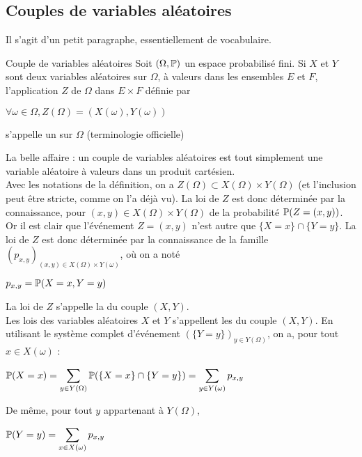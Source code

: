 \documentclass[12pt,a4paper]{report}
\begin{document}
\subsection{Couples de variables aléatoires}
Il s'agit d'un petit paragraphe, essentiellement de vocabulaire.

\begin{definition}{Couple de variables aléatoires}{}
Soit $(\Omega, \mathbb{P})$ un espace probabilisé fini. Si $X$ et $Y$ sont deux variables aléatoires sur $\Omega$, à valeurs dans les ensembles $E$ et $F$, l'application $Z$ de $\Omega$ dans $E \times F$ définie par 
\begin{center}
$\forall \omega \in \Omega, Z(\Omega) = (X(\omega), Y(\omega))$
\end{center}
s'appelle un  sur $\Omega$ (terminologie officielle)
\end{definition}

La belle affaire : un couple de variables aléatoires est tout simplement une variable aléatoire à valeurs dans un produit cartésien. \\

Avec les notations de la définition, on a $Z(\Omega) \subset X(\Omega) \times Y(\Omega)$ (et l'inclusion peut être stricte, comme on l'a déjà vu). La loi de $Z$ est donc déterminée par la connaissance, pour $(x,y) \in X(\Omega) \times Y(\Omega)$ de la probabilité $\mathbb{P}(Z=(x,y))$. \\
Or il est clair que l'événement $Z=(x,y)$ n'est autre que $\{X=x\} \cap \{Y=y\}$. La loi de $Z$ est donc déterminée par la connaissance de la famille $(p_{x,y})_{(x,y) \in X(\Omega) \times Y(\omega)}$, où on a noté 
\begin{center}
$p_{x,y} = \mathbb{P}(X=x,Y=y)$
\end{center}

La loi de $Z$ s'appelle la  du couple $(X,Y)$. \\

Les lois des variables aléatoires $X$ et $Y$ s'appellent les  du couple $(X,Y)$. En utilisant le système complet d'événement $(\{Y=y\})_{y \in Y(\Omega)}$, on a, pour tout $x \in X(\omega)$ :
\begin{center}
$\mathbb{P}(X=x) = \displaystyle \sum_{y\in Y(\Omega)} \mathbb{P}(\{X=x\} \cap \{Y=y\}) = \sum_{y \in Y(\omega)} p_{x,y}$
\end{center}

De même, pour tout $y$ appartenant à $Y(\Omega)$,
\begin{center}
$\mathbb{P}(Y=y) = \displaystyle \sum_{x \in X(\omega)} p_{x,y}$
\end{center}
\end{document}
